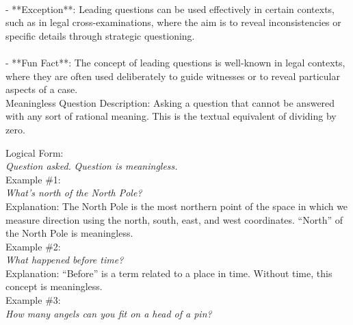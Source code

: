 \documentclass[a4paper,12pt,single,pdftex]{scrartcl}
\begin{document}
    \\

    
      - **Exception**: Leading questions can be used effectively in certain contexts, such as in legal cross-examinations, where the aim is to reveal inconsistencies or specific details through strategic questioning.
    \\

    
      
    \\

    
      - **Fun Fact**: The concept of leading questions is well-known in legal contexts, where they are often used deliberately to guide witnesses or to reveal particular aspects of a case.
    \\

  

Meaningless Question
    Description: Asking a question that cannot be answered with any sort of rational meaning. This is the textual equivalent of dividing by zero.

    
      Logical Form:
    \\

    
      {\em Question asked.} \newline
{\em Question is meaningless.}
    \\

    
      Example \#1:
    \\

    
      {\em What’s north of the North Pole?}
    \\

    
      Explanation: The North Pole is the most northern point of the space in which we measure direction using the north, south, east, and west coordinates. “North” of the North Pole is meaningless.
    \\

    
      Example \#2:
    \\

    
      {\em What happened before time?}
    \\

    
      Explanation: “Before” is a term related to a place in time. Without time, this concept is meaningless.
    \\

    
      Example \#3:
    \\

    
      {\em How many angels can you fit on a head of a pin?}
    \\
\end{document}
